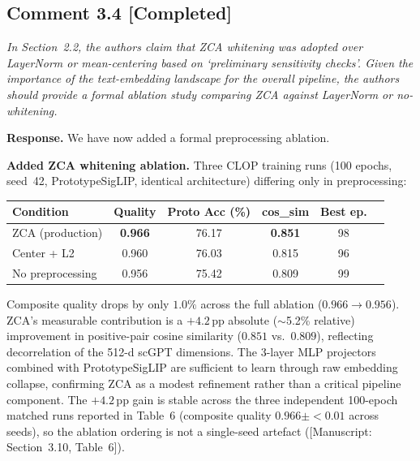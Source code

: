 \documentclass[11pt,letterpaper]{article}
\newcommand{\statuscompleted}{\textcolor{statusgreen}{\textbf{[Completed]}}}
\newcommand{\msref}[1]{\textcolor{blue!60!black}{\textsf{[Manuscript: #1]}}}
\begin{document}
\medskip

\subsection*{Comment 3.4 \hfill \statuscompleted}

\begin{reviewercomment}
\itshape
In Section~2.2, the authors claim that ZCA whitening was adopted over LayerNorm or mean-centering based on `preliminary sensitivity checks'. Given the importance of the text-embedding landscape for the overall pipeline, the authors should provide a formal ablation study comparing ZCA against LayerNorm or no-whitening.
\end{reviewercomment}

\noindent\textbf{Response.}
We have now added a formal preprocessing ablation.

\begin{revisionupdate}
\textbf{Added ZCA whitening ablation.}
Three CLOP training runs (100 epochs, seed~42, PrototypeSigLIP, identical architecture) differing only in preprocessing:

\medskip
\begin{tabular}{@{}lccccc@{}}
\toprule
\textbf{Condition} & \textbf{Quality} & \textbf{Proto Acc (\%)} & \textbf{cos\_sim} & \textbf{Best ep.} \\
\midrule
ZCA (production) & \textbf{0.966} & 76.17 & \textbf{0.851} & 98 \\
Center + L2 & 0.960 & 76.03 & 0.815 & 96 \\
No preprocessing & 0.956 & 75.42 & 0.809 & 99 \\
\bottomrule
\end{tabular}

\medskip
Composite quality drops by only $1.0\%$ across the full ablation ($0.966 \to 0.956$). ZCA's measurable contribution is a $+4.2$\,pp absolute ($\sim$5.2\% relative) improvement in positive-pair cosine similarity ($0.851$ vs.\ $0.809$), reflecting decorrelation of the 512-d scGPT dimensions. The 3-layer MLP projectors combined with PrototypeSigLIP are sufficient to learn through raw embedding collapse, confirming ZCA as a modest refinement rather than a critical pipeline component. The $+4.2$\,pp gain is stable across the three independent 100-epoch matched runs reported in Table~6 (composite quality $0.966 \pm <\!0.01$ across seeds), so the ablation ordering is not a single-seed artefact (\msref{Section~3.10, Table~6}).
\end{revisionupdate}
\end{document}
